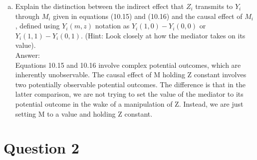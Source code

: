\documentclass[11pt,notitlepage]{article}\usepackage[]{graphicx}\usepackage[]{color}
\makeatletter
\newenvironment{kframe}{%
 \def\at@end@of@kframe{}%
 \ifinner\ifhmode%
  \def\at@end@of@kframe{\end{minipage}}%
  \begin{minipage}{\columnwidth}%
 \fi\fi%
 \def\FrameCommand##1{\hskip\@totalleftmargin \hskip-\fboxsep
 \colorbox{shadecolor}{##1}\hskip-\fboxsep
     \hskip-\linewidth \hskip-\@totalleftmargin \hskip\columnwidth}%
 \MakeFramed {\advance\hsize-\width
   \@totalleftmargin\z@ \linewidth\hsize
   \@setminipage}}%
 {\par\unskip\endMakeFramed%
 \at@end@of@kframe}
\newenvironment{knitrout}{}{} %
\makeatother
\begin{document}
\begin{enumerate}[a)]
\item Explain the distinction between the indirect effect that $Z_i$ transmits to $Y_i$ through $M_i$ given in equations (10.15) and (10.16) and the causal effect of $M_i$, defined using $Y_i(m, z)$ notation as $Y_i(1, 0) - Y_i(0, 0)$ or $Y_i(1, 1) - Y_i(0, 1)$. (Hint: Look closely at how the mediator takes on its value).\\
Answer:\\
Equations 10.15 and 10.16 involve complex potential outcomes, which are inherently unobservable. The causal effect of M holding Z constant involves two potentially observable potential outcomes. The difference is that in the latter comparison, we are not trying to set the value of the mediator to its potential outcome in the wake of a manipulation of Z. Instead, we are just setting M to a value and holding Z constant.
\end{enumerate}


\section*{Question 2}
\begin{knitrout}
\color{fgcolor}\begin{kframe}
\begin{verbatim}






\end{verbatim}
\end{kframe}
\end{knitrout}
\end{document}
